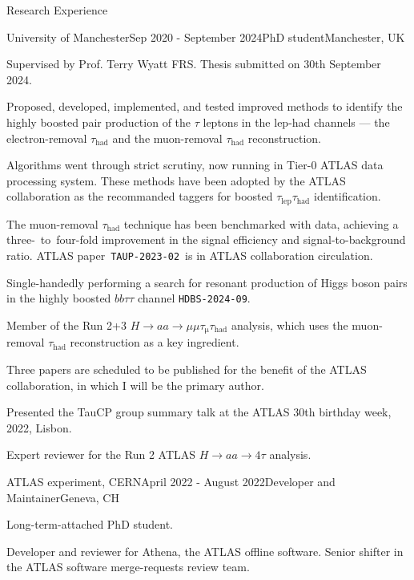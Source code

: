 \documentclass{resume} %
\begin{document}
    \begin{rSection}{Research Experience}
        \begin{rSubsection}{University of Manchester}{Sep 2020 - September 2024}{PhD student}{Manchester, UK}
            \item   Supervised by Prof. Terry Wyatt FRS. Thesis submitted on 30th September 2024.
            \item   Proposed, developed, implemented, and tested improved methods to identify the highly boosted pair production of the $\tau$ leptons in the lep-had channels --- the electron-removal $\tau_\mathrm{had}$ and the muon-removal $\tau_\mathrm{had}$ reconstruction.
            \item   Algorithms went through strict scrutiny, now running in Tier-0 ATLAS data processing system. These methods have been
                adopted by the ATLAS collaboration as the recommanded taggers for boosted $\tau_\mathrm{lep}\tau_\mathrm{had}$ identification.
            \item   The muon-removal $\tau_\mathrm{had}$ technique has been benchmarked with data, achieving a three-~to~four-fold 
                improvement in the signal efficiency and signal-to-background ratio. ATLAS paper~\texttt{TAUP-2023-02}~is in ATLAS collaboration circulation.
            \item   Single-handedly performing a search for resonant production of Higgs boson pairs in the highly boosted $bb\tau\tau$ channel \texttt{HDBS-2024-09}. 
            \item   Member of the Run 2+3 $H\rightarrow aa\rightarrow \mu\mu\tau_\mathrm{\mu}\tau_\mathrm{had}$ analysis, which uses the muon-removal $\tau_\mathrm{had}$ reconstruction as a key ingredient.
            \item   Three papers are scheduled to be published for the benefit of the ATLAS collaboration, in which I will be the primary author.
            \item   Presented the TauCP group summary talk at the ATLAS 30th birthday week, 2022, Lisbon.
            \item   Expert reviewer for the Run 2 ATLAS $H\rightarrow aa\rightarrow 4\tau$ analysis.
        \end{rSubsection}
        \begin{rSubsection}{ATLAS experiment, CERN}{April 2022 - August 2022}{Developer and Maintainer}{Geneva, CH}
            \item Long-term-attached PhD student.
            \item Developer and reviewer for Athena, the ATLAS offline software. Senior shifter in the ATLAS software merge-requests review team.

\end{rSubsection}
\end{rSection}
\end{document}
